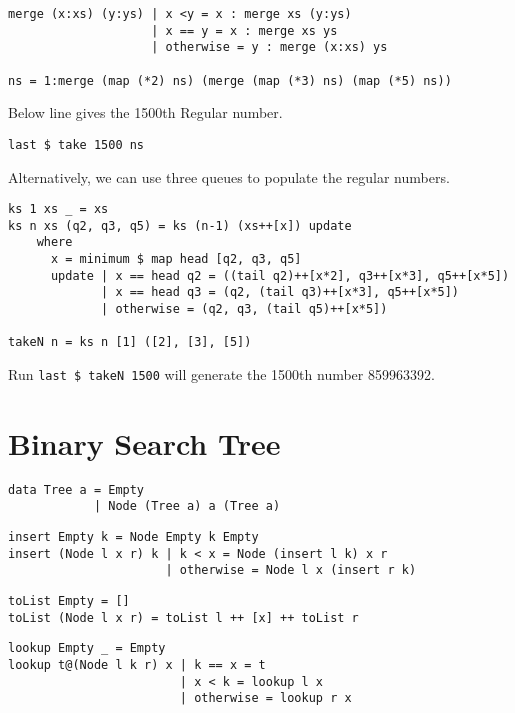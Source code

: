 \documentclass{article}
\begin{document}
\begin{lstlisting}[caption=Recursive Hamming number definition]
merge (x:xs) (y:ys) | x <y = x : merge xs (y:ys)
                    | x == y = x : merge xs ys
                    | otherwise = y : merge (x:xs) ys

ns = 1:merge (map (*2) ns) (merge (map (*3) ns) (map (*5) ns))
\end{lstlisting}

Below line gives the 1500th Regular number.
\begin{verbatim}
last $ take 1500 ns
\end{verbatim}

Alternatively, we can use three queues to populate the regular numbers.

\begin{lstlisting}[caption=Populate Hamming number with queues]
ks 1 xs _ = xs
ks n xs (q2, q3, q5) = ks (n-1) (xs++[x]) update
    where
      x = minimum $ map head [q2, q3, q5]
      update | x == head q2 = ((tail q2)++[x*2], q3++[x*3], q5++[x*5])
             | x == head q3 = (q2, (tail q3)++[x*3], q5++[x*5])
             | otherwise = (q2, q3, (tail q5)++[x*5])

takeN n = ks n [1] ([2], [3], [5])
\end{lstlisting}

Run \texttt{last \$ takeN 1500} will generate the 1500th number 859963392.

\section{Binary Search Tree}

\begin{lstlisting}[caption=Algebraic data type definition of BST]
data Tree a = Empty
            | Node (Tree a) a (Tree a)
\end{lstlisting}

\begin{lstlisting}[caption=BST insertion]
insert Empty k = Node Empty k Empty
insert (Node l x r) k | k < x = Node (insert l k) x r
                      | otherwise = Node l x (insert r k)
\end{lstlisting}

\begin{lstlisting}[caption=Flattern BST to ordered list.]
toList Empty = []
toList (Node l x r) = toList l ++ [x] ++ toList r
\end{lstlisting}

\begin{lstlisting}[caption=look up]
lookup Empty _ = Empty
lookup t@(Node l k r) x | k == x = t
                        | x < k = lookup l x
                        | otherwise = lookup r x
\end{lstlisting}
\end{document}
